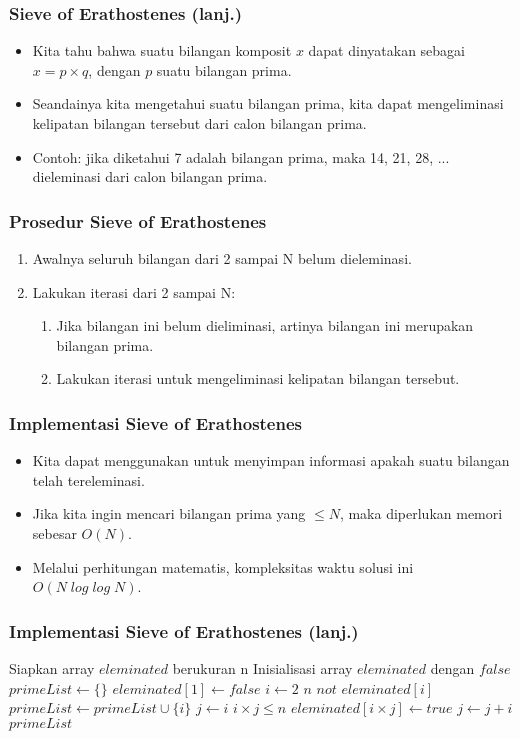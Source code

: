 \begin{frame}
\frametitle{Sieve of Erathostenes (lanj.)}
\begin{itemize}
  \item Kita tahu bahwa suatu bilangan komposit $x$ dapat dinyatakan sebagai $x = p \times q$, dengan $p$ suatu bilangan prima.
  \item Seandainya kita mengetahui suatu bilangan prima, kita dapat mengeliminasi kelipatan bilangan tersebut dari calon bilangan prima.
  \item Contoh: jika diketahui 7 adalah bilangan prima, maka 14, 21, 28, ... dieleminasi dari calon bilangan prima.
\end{itemize}
\end{frame}

\begin{frame}
\frametitle{Prosedur Sieve of Erathostenes}
\begin{enumerate}
  \item Awalnya seluruh bilangan dari 2 sampai N belum dieleminasi.
  \item Lakukan iterasi dari 2 sampai N:
  \begin{enumerate}
    \item Jika bilangan ini belum dieliminasi, artinya bilangan ini merupakan bilangan prima.
    \item Lakukan iterasi untuk mengeliminasi kelipatan bilangan tersebut.  
  \end{enumerate}
\end{enumerate}
\end{frame}

\begin{frame}
\frametitle{Implementasi Sieve of Erathostenes}
\begin{itemize}
  \item Kita dapat menggunakan   untuk menyimpan informasi apakah suatu bilangan telah tereleminasi.
  \item Jika kita ingin mencari bilangan prima yang $\leq N$, maka diperlukan memori sebesar $O(N)$.
  \item Melalui perhitungan matematis, kompleksitas waktu solusi ini $O(N\;log\;log\;N)$.
\end{itemize}
\end{frame}

\begin{frame}[fragile]
\frametitle{Implementasi Sieve of Erathostenes (lanj.)}
\begin{codebox}
\li \Comment Siapkan array $eleminated$ berukuran n
\li \Comment Inisialisasi array $eleminated$ dengan $false$
\li $primeList \gets \{\}$
\li $eleminated[1] \gets false$
\li \For $i \gets 2$ \To $n$
    \Do
\li   \If $not$ $eleminated[i]$
      \Then
\li     $primeList \gets primeList \cup \{i\}$
\li     $j \gets i$
\li     \While $i \times j \leq n$
        \Do
\li       $eleminated[i \times j] \gets true$
\li       $j \gets j + i$       
        \End
      \End      
    \End
\li \Return $primeList$
\end{codebox}
\end{frame}

